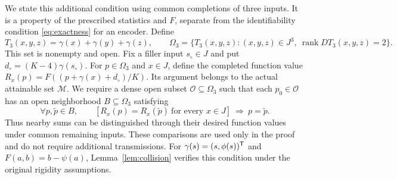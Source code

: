 We state this additional condition using common completions of three inputs. It is a property of the prescribed statistics and $F$, separate from the identifiability condition \eqref{eq:exactness} for an encoder. Define
$$
 T_3(x,y,z)=\gamma(x)+\gamma(y)+\gamma(z),\qquad
 \Omega_3=\{T_3(x,y,z):(x,y,z)\in J^3,\ \operatorname{rank}DT_3(x,y,z)=2\}.
$$
This set is nonempty and open. Fix a filler input $s_\circ\in J$ and put $d_\circ=(K-4)\gamma(s_\circ)$. For $p\in\Omega_3$ and $x\in J$, define the completed function value $R_x(p)=F((p+\gamma(x)+d_\circ)/K)$. Its argument belongs to the actual attainable set $\mathcal M$. We require a dense open subset $\mathcal O\subseteq\Omega_3$ such that each $p_0\in\mathcal O$ has an open neighborhood $B\subseteq\Omega_3$ satisfying
\begin{equation}
 \forall p,\widetilde p\in B,\qquad
 [R_x(p)=R_x(\widetilde p)\ \text{for every }x\in J]
 \ \Longrightarrow\ p=\widetilde p.
 \label{eq:completion-id}
\end{equation}
Thus nearby sums can be distinguished through their desired function values under common remaining inputs. These comparisons are used only in the proof and do not require additional transmissions. For $\gamma(s)=(s,\phi(s))^\mathsf T$ and $F(a,b)=b-\psi(a)$, Lemma~\ref{lem:collision} verifies this condition under the original rigidity assumptions.


